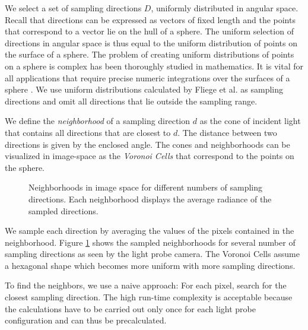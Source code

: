  We select a set of sampling directions $D$, uniformly distributed in angular space.
 Recall that directions can be expressed as vectors of fixed length and the points that correspond to a vector lie on the hull of a sphere. 
 The uniform selection of directions in angular space is thus equal to the uniform distribution of points on the surface of a sphere. 
 The problem of creating uniform distributions of points on a sphere is complex has been thoroughly studied in mathematics.
 It is vital for all applications that require precise numeric integrations over the surfaces of a sphere \cite{saff1997distributing}.
 We use uniform distributions calculated by Fliege et al. \cite{fliege1999distribution} as sampling directions and omit all directions that lie outside the sampling range.
 
 We define the \emph{neighborhood} of a sampling direction $d$ as the cone of incident light that contains all directions that are closest to $d$. 
 The distance between two directions is given by the enclosed angle.
 The cones and neighborhoods can be visualized in image-space as the \emph{Voronoi Cells} that correspond to the points on the sphere.
 
 
 
  \begin{figure}[H]
    \hfill
    \hfill
    \hfill
    
    \caption[Nearest-neighbor sampling examples]{Neighborhoods in image space for different numbers of sampling directions. Each neighborhood displays the average radiance of the sampled directions.}\label{fig:voronoi}
  \end{figure}
 
 
 We sample each direction by averaging the values of the pixels contained in the neighborhood.
 Figure \ref{fig:voronoi} shows the sampled neighborhoods for several number of sampling directions  as seen by the light probe camera.
 The Voronoi Cells assume a hexagonal shape which becomes more uniform with more sampling directions. 
 
 To find the neighbors, we use a naive approach: For each pixel, search for the closest sampling direction.
 The high run-time complexity is acceptable because the calculations have to be carried out only once for each light probe configuration and can thus be precalculated.
 
